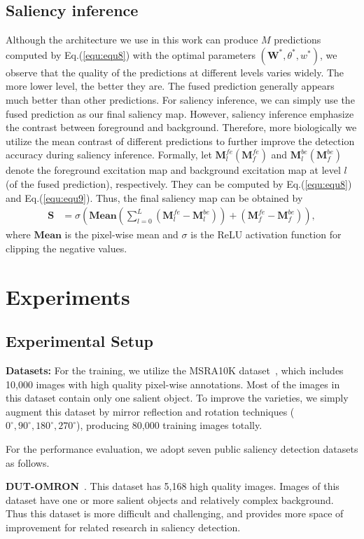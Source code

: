 \documentclass[10pt,twocolumn,letterpaper]{article}
\begin{document}
\subsection{Saliency inference}
Although the architecture we use in this work can produce $M$ predictions computed by Eq.(\ref{equ:equ8}) with the optimal parameters $(\textbf{W}^{*},\theta^{*},w^{*})$, we observe that the quality of the predictions at different levels varies widely.
The more lower level, the better they are.
The fused prediction generally appears much better than other predictions.
For saliency inference, we can simply use the fused prediction as our final saliency map.
However, saliency inference emphasize the contrast between foreground and background.
Therefore, more biologically we utilize the mean contrast of different predictions to further improve the detection accuracy during saliency inference.
Formally, let $\textbf{M}_{l}^{fe} (\textbf{M}_{f}^{fe})$ and $\textbf{M}_{l}^{be} (\textbf{M}_{f}^{be})$ denote the foreground excitation map and background excitation map at level $l$ (of the fused prediction), respectively.
They can be computed by Eq.(\ref{equ:equ8}) and Eq.(\ref{equ:equ9}).
Thus, the final saliency map can be obtained by
\begin{align}
  \textbf{S} & = \sigma(\textbf{Mean}(\sum_{l=0}^{L}(\textbf{M}_{l}^{fe}-\textbf{M}_{l}^{be}))+(\textbf{M}_{f}^{fe}-\textbf{M}_{f}^{be})),
  \label{equ:equ10}
\end{align}
where $\textbf{Mean}$ is the pixel-wise mean and $\sigma$ is the ReLU activation function for clipping the negative values.
\section{Experiments}
\subsection{Experimental Setup}
\textbf{Datasets:} For the training, we utilize the MSRA10K dataset~\cite{ChengPAMI}, which includes 10,000 images with high quality pixel-wise annotations.
Most of the images in this dataset contain only one salient object.
To improve the varieties, we simply augment this dataset by mirror reflection and rotation techniques ($0^{\circ}, 90^{\circ}, 180^{\circ}, 270^{\circ}$), producing 80,000 training images totally.


For the performance evaluation, we adopt seven public saliency detection datasets as follows.

\textbf{DUT-OMRON}~\cite{yang2013saliency}. This dataset has 5,168 high quality images. Images of this dataset have one or more salient objects and relatively complex background. Thus this dataset is more difficult and challenging, and provides more space of improvement for related research in saliency detection.
\end{document}

